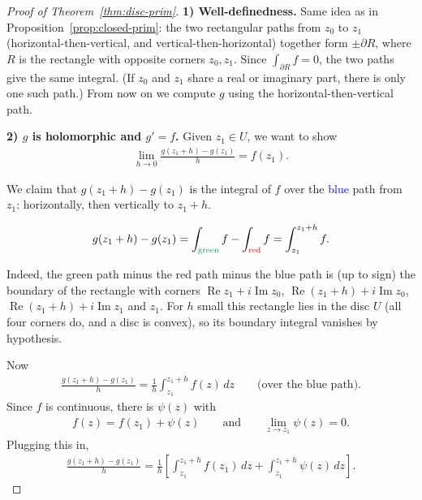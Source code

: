 \documentclass[11pt]{article}
\theoremstyle{plain}
\theoremstyle{definition}
\theoremstyle{remark}
\numberwithin{equation}{section}
\newcommand{\be}{\begin{eqnarray}}
\newcommand{\ee}{\end{eqnarray}}
\DeclareMathOperator{\Real}{Re}
\DeclareMathOperator{\Imag}{Im}
\begin{document}
\begin{proof}[Proof of Theorem~\ref{thm:disc-prim}]
\textbf{1) Well-definedness.} Same idea as in
Proposition~\ref{prop:closed-prim}: the two rectangular paths from $z_0$ to
$z_1$ (horizontal-then-vertical, and vertical-then-horizontal) together form
$\pm\partial R$, where $R$ is the rectangle with opposite corners $z_0,z_1$.
Since $\int_{\partial R}f=0$, the two paths give the same integral. (If
$z_0$ and $z_1$ share a real or imaginary part, there is only one such path.)
From now on we compute $g$ using the horizontal-then-vertical path.

\textbf{2) $g$ is holomorphic and $g'=f$.} Given $z_1\in U$, we want to show
\be
 \lim_{h\to0}\frac{g(z_1+h)-g(z_1)}{h}=f(z_1).
\ee

\noindent
\begin{minipage}[c]{0.44\textwidth}
\centering
{}
\end{minipage}\hfill
\begin{minipage}[c]{0.52\textwidth}
We claim that $g(z_1+h)-g(z_1)$ is the integral of $f$ over the
\textcolor{blue}{blue} path from $z_1$: horizontally, then vertically to $z_1+h$.
\end{minipage}

\be
 g(z_1+h)-g(z_1)=\int_{\text{\textcolor{ForestGreen}{green}}}f-\int_{\text{\textcolor{red}{red}}}f=\int_{z_1}^{z_1+h}f.
\ee

Indeed, the green path minus the red path minus the blue path is (up to
sign) the boundary of the rectangle with corners $\Real z_1+i\Imag z_0$,
$\Real(z_1+h)+i\Imag z_0$, $\Real(z_1+h)+i\Imag z_1$ and $z_1$. For $h$
small this rectangle lies in the disc $U$ (all four corners do, and a disc is
convex), so its boundary integral vanishes by hypothesis.

Now
\be
 \frac{g(z_1+h)-g(z_1)}{h}=\frac1h\int_{z_1}^{z_1+h}f(z)\,dz
 \qquad\text{(over the blue path).}
\ee
Since $f$ is continuous, there is $\psi(z)$ with
\be
 f(z)=f(z_1)+\psi(z)\qquad\text{and}\qquad\lim_{z\to z_1}\psi(z)=0.
\ee
Plugging this in,
\be
 \frac{g(z_1+h)-g(z_1)}{h}
 =\frac1h\left[\int_{z_1}^{z_1+h}f(z_1)\,dz+\int_{z_1}^{z_1+h}\psi(z)\,dz\right].
\ee


\end{proof}
\end{document}
